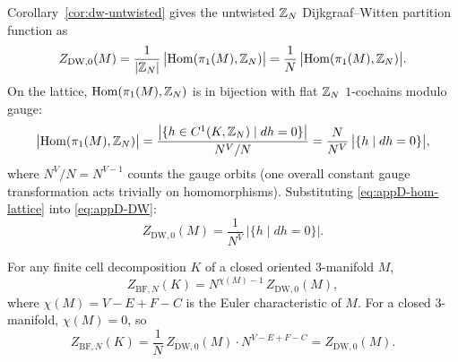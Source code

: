 Corollary~\ref{cor:dw-untwisted} gives the untwisted $\mathbb{Z}_N$ Dijkgraaf--Witten partition function as
\begin{equation}\label{eq:appD-DW}
Z_{\mathrm{DW},0}(M)=\frac{1}{|\mathbb{Z}_N|}\,\bigl|\operatorname{Hom}(\pi_1(M),\mathbb{Z}_N)\bigr|=\frac{1}{N}\,\bigl|\operatorname{Hom}(\pi_1(M),\mathbb{Z}_N)\bigr|.
\end{equation}
On the lattice, $\operatorname{Hom}(\pi_1(M),\mathbb{Z}_N)$ is in bijection with flat $\mathbb{Z}_N$ $1$-cochains modulo gauge:
\begin{equation}\label{eq:appD-hom-lattice}
\bigl|\operatorname{Hom}(\pi_1(M),\mathbb{Z}_N)\bigr|=\frac{\bigl|\{h\in C^1(K,\mathbb{Z}_N)\mid dh=0\}\bigr|}{N^V/N}=\frac{N}{N^V}\,\bigl|\{h\mid dh=0\}\bigr|,
\end{equation}
where $N^V/N=N^{V-1}$ counts the gauge orbits (one overall constant gauge transformation acts trivially on homomorphisms). Substituting \eqref{eq:appD-hom-lattice} into \eqref{eq:appD-DW}:
\begin{equation}\label{eq:appD-DW-lattice}
Z_{\mathrm{DW},0}(M)=\frac{1}{N^V}\,\bigl|\{h\mid dh=0\}\bigr|.
\end{equation}

\begin{proposition}[BF = untwisted DW on a closed \texorpdfstring{$3$}{3}-manifold]\label{prop:appD-bf-equals-dw}
For any finite cell decomposition $K$ of a closed oriented $3$-manifold $M$,
\begin{equation}\label{eq:appD-bf-dw-match}
Z_{\mathrm{BF},N}(K)=N^{\chi(M)-1}\,Z_{\mathrm{DW},0}(M),
\end{equation}
where $\chi(M)=V-E+F-C$ is the Euler characteristic of $M$. For a closed $3$-manifold, $\chi(M)=0$, so
\begin{equation}\label{eq:appD-bf-dw-closed}
Z_{\mathrm{BF},N}(K)=\frac{1}{N}\,Z_{\mathrm{DW},0}(M)\cdot N^{V-E+F-C}=Z_{\mathrm{DW},0}(M).
\end{equation}
\end{proposition}


